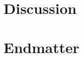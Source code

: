 \documentclass{statsmsc}
\begin{document}
\section{Discussion}



\section*{Endmatter} \label{sec:endmatter}


%
%
%
%
%
%

%
%

\clearpage

 



\clearpage

%
%
%
%

\renewcommand*{\thepage}{Supplementary Material Page \arabic{page}}
\renewcommand{\thesection}{\Alph{section}}
\appendix

\end{document}
